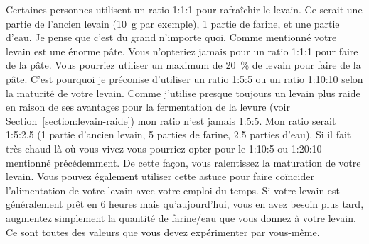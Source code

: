 Certaines personnes utilisent un ratio 1:1:1 pour rafraîchir le levain. Ce serait
une partie de l'ancien levain (\qty{10}{\gram} par exemple), 1 partie de farine,
et une partie d'eau. Je pense que c'est du grand n'importe quoi. Comme mentionné
votre levain est une énorme pâte. Vous n'opteriez jamais pour un ratio 1:1:1 pour
faire de la pâte. Vous pourriez utiliser un maximum de \qty{20}{\percent} de levain pour
faire de la pâte. C'est pourquoi je préconise d'utiliser un ratio 1:5:5 ou un
ratio 1:10:10 selon la maturité de votre levain. Comme j'utilise presque
toujours un levain plus raide en raison de ses avantages pour la fermentation de la levure
(voir Section~\ref{section:levain-raide})
mon ratio n'est jamais 1:5:5. Mon ratio serait 1:5:2.5 (1 partie d'ancien levain,
5 parties de farine, 2.5 parties d'eau). Si il fait très chaud là où vous vivez
vous pourriez opter pour le 1:10:5 ou 1:20:10 mentionné précédemment. De cette
façon, vous ralentissez la maturation de votre levain. Vous pouvez également utiliser cette
astuce pour faire coïncider l'alimentation de votre levain avec votre emploi du temps.
Si votre levain est généralement prêt en 6 heures mais qu'aujourd'hui, vous en avez besoin
plus tard, augmentez simplement la quantité de farine/eau que vous donnez à votre levain.
Ce sont toutes des valeurs que vous devez expérimenter par vous-même.
